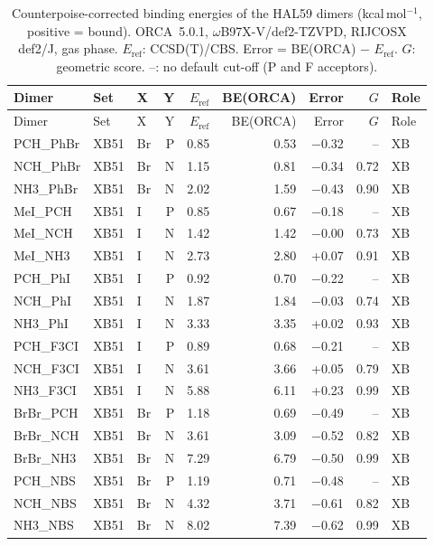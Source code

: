 {\scriptsize
\setlength{\tabcolsep}{3pt}
\begin{longtable}{lllrrrrrl}
\caption{Counterpoise-corrected binding energies of the HAL59 dimers (kcal\,mol$^{-1}$, positive = bound). ORCA~5.0.1, $\omega$B97X-V/def2-TZVPD, RIJCOSX def2/J, gas phase. $E_\mathrm{ref}$: CCSD(T)/CBS. Error = BE(ORCA) $-$ $E_\mathrm{ref}$. $G$: geometric score. --: no default cut-off (P and F acceptors).}\label{tab:cphal}\\
\toprule
Dimer & Set & X & Y & $E_\mathrm{ref}$ & BE(ORCA) & Error & $G$ & Role\\
\midrule
\endfirsthead
\toprule
Dimer & Set & X & Y & $E_\mathrm{ref}$ & BE(ORCA) & Error & $G$ & Role\\
\midrule
\endhead
\bottomrule
\endlastfoot
PCH\_PhBr & XB51 & Br & P & 0.85 & 0.53 & $-$0.32 & -- & XB\\
NCH\_PhBr & XB51 & Br & N & 1.15 & 0.81 & $-$0.34 & 0.72 & XB\\
NH3\_PhBr & XB51 & Br & N & 2.02 & 1.59 & $-$0.43 & 0.90 & XB\\
MeI\_PCH & XB51 & I & P & 0.85 & 0.67 & $-$0.18 & -- & XB\\
MeI\_NCH & XB51 & I & N & 1.42 & 1.42 & $-$0.00 & 0.73 & XB\\
MeI\_NH3 & XB51 & I & N & 2.73 & 2.80 & +0.07 & 0.91 & XB\\
PCH\_PhI & XB51 & I & P & 0.92 & 0.70 & $-$0.22 & -- & XB\\
NCH\_PhI & XB51 & I & N & 1.87 & 1.84 & $-$0.03 & 0.74 & XB\\
NH3\_PhI & XB51 & I & N & 3.33 & 3.35 & +0.02 & 0.93 & XB\\
PCH\_F3CI & XB51 & I & P & 0.89 & 0.68 & $-$0.21 & -- & XB\\
NCH\_F3CI & XB51 & I & N & 3.61 & 3.66 & +0.05 & 0.79 & XB\\
NH3\_F3CI & XB51 & I & N & 5.88 & 6.11 & +0.23 & 0.99 & XB\\
BrBr\_PCH & XB51 & Br & P & 1.18 & 0.69 & $-$0.49 & -- & XB\\
BrBr\_NCH & XB51 & Br & N & 3.61 & 3.09 & $-$0.52 & 0.82 & XB\\
BrBr\_NH3 & XB51 & Br & N & 7.29 & 6.79 & $-$0.50 & 0.99 & XB\\
PCH\_NBS & XB51 & Br & P & 1.19 & 0.71 & $-$0.48 & -- & XB\\
NCH\_NBS & XB51 & Br & N & 4.32 & 3.71 & $-$0.61 & 0.82 & XB\\
NH3\_NBS & XB51 & Br & N & 8.02 & 7.39 & $-$0.62 & 0.99 & XB\\

\end{longtable}}
